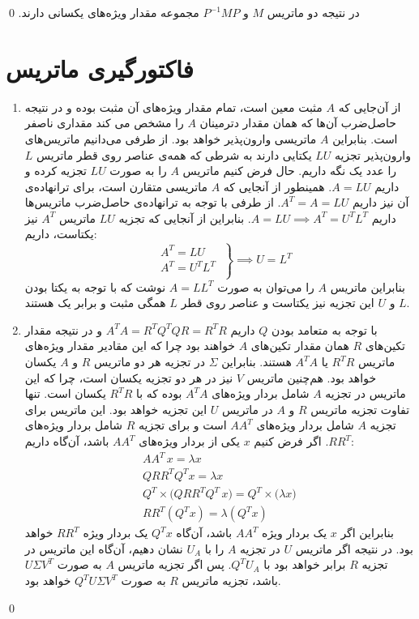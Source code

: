 \documentclass[a4paper, 11pt]{article}
\begin{document}
در نتیجه دو ماتریس $M$ و
$P^{-1}MP$
مجموعه مقدار ویژه‌های یکسانی دارند.
\qed

\section{فاکتورگیری ماتریس}
\begin{enumerate}
	\item
	از آن‌جایی که $A$ مثبت معین است، تمام مقدار ویژه‌های آن مثبت بوده و در نتیجه حاصل‌ضرب آن‌ها که همان مقدار دترمینان $A$ را مشخص می کند مقداری ناصفر است. بنابراین $A$ ماتریسی وارون‌پذیر خواهد بود. از طرفی می‌دانیم ماتریس‌های وارون‌پذیر تجزیه $LU$ یکتایی دارند به شرطی که همه‌ی عناصر روی قطر ماتریس $L$ را عدد یک نگه‌ داریم. حال فرض کنیم ماتریس $A$‌ را به صورت $LU$ تجزیه کرده و داریم $A = LU$. همینطور از آنجایی که $A$ ماتریسی متقارن است، برای ترانهاده‌ی آن نیز داریم $A^T = A = LU$. از طرفی با توجه به ترانهاده‌ی حاصل‌ضرب ماتریس‌ها داریم
	$A = LU \implies A^T = U^TL^T$.
	بنابراین از آنجایی که تجزیه $LU$ ماتریس $A^T$ نیز یکتاست، داریم:
	\[
	\left.\begin{aligned}
		&A^T = LU \;\\
		&A^T = U^TL^T \;\\
	\end{aligned}\right\}\implies U = L^T
	\]
	بنابراین ماتریس $A$ را می‌توان به صورت $A = LL^T$ نوشت که با توجه به یکتا بودن $L$ و $U$ این تجزیه نیز یکتاست و عناصر روی قطر $L$ همگی مثبت و برابر یک هستند.
	\item
	با توجه به متعامد بودن $Q$ داریم
	$A^TA = R^TQ^TQR = R^TR$
	و در نتیجه مقدار تکین‌های $R$ همان مقدار تکین‌های $A$ خواهند بود چرا که این مقادیر مقدار ویژه‌های ماتریس $R^TR$ یا $A^TA$ هستند. بنابراین $\Sigma$ در تجزیه  هر دو ماتریس $R$ و $A$‌ یکسان خواهد بود. هم‌چنین ماتریس $V$ نیز در هر دو تجزیه یکسان است، چرا که این ماتریس در تجزیه $A$ شامل بردار ویژه‌های $A^TA$ بوده که با $R^TR$ یکسان است. تنها تفاوت تجزیه  ماتریس $R$ و $A$ در ماتریس $U$ این تجزیه خواهد بود. این ماتریس برای تجزیه $A$ شامل بردار ویژه‌های $AA^T$ است و برای تجزیه $R$ شامل بردار ویژه‌های $RR^T$. اگر فرض کنیم $x$ یکی از بردار ویژه‌های $AA^T$ باشد، آن‌گاه داریم:
	\[
	\begin{gathered}
		AA^T \, x = \lambda x \\
		QRR^TQ^T x = \lambda x \\
		Q^T \times \Big(QRR^TQ^T \, x\Big) = Q^T \times \Big(\lambda x\Big) \\
		RR^T (Q^Tx) = \lambda (Q^Tx)
	\end{gathered}
	\]
	بنابراین اگر $x$ یک بردار ویژه $AA^T$ باشد، آن‌گاه $Q^Tx$ یک بردار ویژه $RR^T$ خواهد بود. در نتیجه اگر ماتریس $U$ در تجزیه $A$ را با $U_A$ نشان دهیم، آن‌گاه این ماتریس در تجزیه $R$ برابر خواهد بود با $Q^TU_A$. پس اگر تجزیه  ماتریس $A$ به صورت $U\Sigma V^T$ باشد، تجزیه  ماتریس $R$ به صورت $Q^TU\Sigma V^T$ خواهد بود.
\end{enumerate}
\qed
\end{document}
